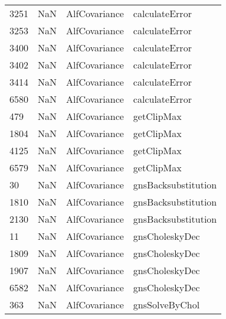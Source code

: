 \begin{tabular}{llll}
3251 &                   NaN &              AlfCovariance &                            calculateError \\
3253 &                   NaN &              AlfCovariance &                            calculateError \\
3400 &                   NaN &              AlfCovariance &                            calculateError \\
3402 &                   NaN &              AlfCovariance &                            calculateError \\
3414 &                   NaN &              AlfCovariance &                            calculateError \\
6580 &                   NaN &              AlfCovariance &                            calculateError \\
479  &                   NaN &              AlfCovariance &                                getClipMax \\
1804 &                   NaN &              AlfCovariance &                                getClipMax \\
4125 &                   NaN &              AlfCovariance &                                getClipMax \\
6579 &                   NaN &              AlfCovariance &                                getClipMax \\
30   &                   NaN &              AlfCovariance &                       gnsBacksubstitution \\
1810 &                   NaN &              AlfCovariance &                       gnsBacksubstitution \\
2130 &                   NaN &              AlfCovariance &                       gnsBacksubstitution \\
11   &                   NaN &              AlfCovariance &                            gnsCholeskyDec \\
1809 &                   NaN &              AlfCovariance &                            gnsCholeskyDec \\
1907 &                   NaN &              AlfCovariance &                            gnsCholeskyDec \\
6582 &                   NaN &              AlfCovariance &                            gnsCholeskyDec \\
363  &                   NaN &              AlfCovariance &                            gnsSolveByChol \\

\end{tabular}
